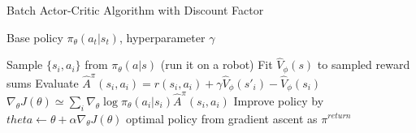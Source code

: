 \begin{algorithm}[t!]
\caption{Batch Actor-Critic Algorithm with Discount Factor}
\begin{algorithmic}[1]
\label{alg:batchacwdf}
\REQUIRE Base policy $\pi_\theta(a_t|s_t)$, hyperparameter $\gamma$

    \STATE Sample $\{s_i,a_i\}$ from $\pi_\theta(a|s)$ (run it on a robot)
    \STATE Fit $\hat{V}_\phi(s)$ to sampled reward sums
    \STATE Evaluate $\hat{A}^\pi(s_i,a_i) = r(s_i,a_i)+\gamma\hat{V}_\phi(s'_i)-\hat{V}_\phi(s_i)$
    \STATE $\nabla_\theta J(\theta) \simeq \sum_i\nabla_\theta\log \pi_\theta(a_i|s_i)\hat{A}^\pi(s_i,a_i)$
    \STATE Improve policy by $theta \leftarrow \theta + \alpha\nabla_\theta J(\theta)$
\ENDWHILE
\RETURN optimal policy from gradient ascent as $\pi^{return}$
\end{algorithmic}
\end{algorithm}